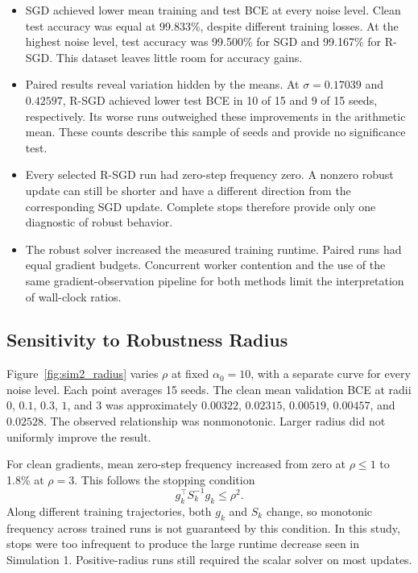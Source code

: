 \begin{itemize}
    \item SGD achieved lower mean training and test BCE at every noise level.
    Clean test accuracy was equal at 99.833\%, despite different training losses.
    At the highest noise level, test accuracy was 99.500\% for SGD and
    99.167\% for R-SGD. This dataset leaves little room for accuracy gains.
    \item Paired results reveal variation hidden by the means. At
    $\sigma=0.17039$ and $0.42597$, R-SGD achieved lower test BCE in
    10 of 15 and 9 of 15 seeds, respectively. Its worse runs outweighed these
    improvements in the arithmetic mean. These counts describe this sample of
    seeds and provide no significance test.
    \item Every selected R-SGD run had zero-step frequency zero. A nonzero
    robust update can still be shorter and have a different direction from
    the corresponding SGD update. Complete stops therefore provide only one
    diagnostic of robust behavior.
    \item The robust solver increased the measured training runtime.
    Paired runs had equal gradient budgets. Concurrent worker contention and
    the use of the same gradient-observation pipeline for both methods limit
    the interpretation of wall-clock ratios.
\end{itemize}

\subsection{Sensitivity to Robustness Radius}
\label{sec:sim2_radius}

Figure~\ref{fig:sim2_radius} varies $\rho$ at fixed $\alpha_0=10$, with a separate
curve for every noise level. Each point averages 15 seeds.
The clean mean validation BCE at radii
$0$, $0.1$, $0.3$, $1$, and $3$ was approximately
$0.00322$, $0.02315$, $0.00519$, $0.00457$, and $0.02528$.
The observed relationship was nonmonotonic. Larger radius did not uniformly
improve the result.

For clean gradients, mean zero-step frequency increased from zero at
$\rho\leq1$ to 1.8\% at $\rho=3$. This follows the stopping condition
\[
g_k^\top S_k^{-1}g_k\leq\rho^2.
\]
Along different training trajectories, both $g_k$ and $S_k$ change, so monotonic
frequency across trained runs is not guaranteed by this condition.
In this study, stops were too infrequent to produce the large runtime decrease
seen in Simulation 1. Positive-radius runs still required the scalar solver on
most updates.

